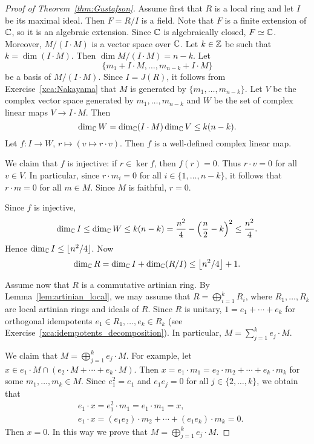 \begin{proof}[Proof of Theorem~\ref{thm:Gustafson}]
    Assume first that $R$ is a local ring and let $I$ be its maximal ideal. Then 
    $F=R/I$ is a field. Note that $F$ is a finite extension of $\mathbb{C}$, so it is an algebraic extension. 
    Since $\mathbb{C}$ is algebraically closed, $F\simeq\mathbb{C}$. Moreover, 
    $M/(I\cdot M)$ is a vector space over $\mathbb{C}$. 
    Let $k\in\mathbb{Z}$ be such that 
    $k=\dim (I\cdot M)$. Then 
    $\dim M/(I\cdot M)=n-k$. Let  
    \[
        \{m_1+I\cdot M,\dots,m_{n-k} +I\cdot M\}
    \]
    be a basis of $M/(I\cdot M)$. 
    Since $I=J(R)$, it follows from Exercise~\ref{xca:Nakayama} that $M$ is generated by 
    $\{m_1,\dots,m_{n-k}\}$. Let $V$ be the complex vector space 
    generated by $m_1,\dots,m_{n-k}$ and $W$ be the set of complex linear maps 
    $V\to I\cdot M$. Then 
    \[
    \dim_{\mathbb{C}}W=\dim_{\mathbb{C}}(I\cdot M)\dim_{\mathbb{C}}V\leq k(n-k).
    \]
    Let $f\colon I\to W$, $r\mapsto (v\mapsto r\cdot v)$. Then $f$ is a well-defined complex linear map. 
    
    We claim that 
    $f$ is injective: if $r\in\ker f$, then $f(r)=0$. Thus $r\cdot v=0$ for all $v\in V$. In particular, since 
    $r\cdot m_i=0$ for all $i\in\{1,\dots,n-k\}$, it follows that $r\cdot m=0$ for all $m\in M$. 
    Since $M$ is faithful, $r=0$. 

    Since $f$ is injective, 
    \[
    \dim_{\mathbb{C}} I\leq\dim_{\mathbb{C}}W\leq k(n-k)=\frac{n^2}{4}-\left(\frac{n}{2}-k\right)^2\leq\frac{n^2}{4}.
    \]
    Hence $\dim_{\mathbb{C}}I\leq\lfloor n^2/4\rfloor$. Now 
    \[
    \dim_{\mathbb{C}}R=\dim_{\mathbb{C}}I+\dim_{\mathbb{C}}(R/I)\leq \left\lfloor n^2/4\right\rfloor+1. 
    \]

    Assume now that $R$ is a commutative artinian ring. By Lemma~\ref{lem:artinian_local}, we may assume
    that $R=\bigoplus_{i=1}^k R_i$, where $R_1,\dots,R_k$ are local artinian rings and ideals of $R$. Since $R$ is unitary, $1=e_1+\cdots+e_k$ 
    for orthogonal idempotents $e_1\in R_1,\dots,e_k\in R_k$ 
    (see Exercise~\ref{xca:idempotents_decomposition}). 
    In particular,  
    $M=\sum_{j=1}^k e_j\cdot M$. 

    We claim that $M=\bigoplus_{j=1}^k e_j\cdot M$. For example, let $x\in e_1\cdot M\cap (e_2\cdot M+\cdots+e_k\cdot M)$. Then 
    $x=e_1\cdot m_1=e_2\cdot m_2+\cdots+e_k\cdot m_k$ 
    for some $m_1,\dots,m_k\in M$. Since $e_1^2=e_1$ and 
    $e_1e_j=0$ for all $j\in\{2,\dots,k\}$, we obtain that 
    \begin{align*}
        &e_1\cdot x=e_1^2\cdot m_1=e_1\cdot m_1=x,\\
        &e_1\cdot x=(e_1e_2)\cdot m_2+\cdots+(e_1e_k)\cdot m_k=0.
    \end{align*}
    Then $x=0$. In this way we prove that $M=\bigoplus_{j=1}^k e_j\cdot M$. 
    

\end{proof}
